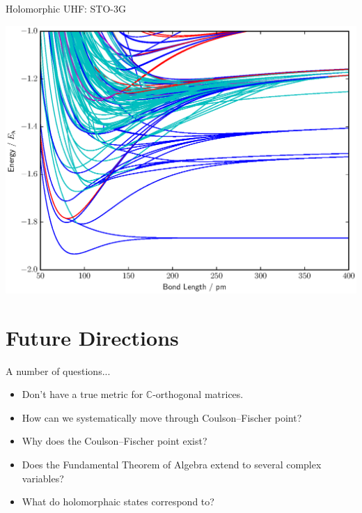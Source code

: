 \documentclass{beamer}
\begin{document}
\begin{frame}{Holomorphic UHF:  STO-3G}
\vspace{-0.9em}
  \begin{center}
    \includegraphics[scale=0.45]{BFGS_UHF_H4_rect_sto-3g}
  \end{center}
\end{frame}


\section{Future Directions}
\begin{frame}{A number of questions...}
 \begin{itemize}
  \item{Don't have a true metric for $\mathbb{C}$-orthogonal matrices.}
  \item{How can we systematically move through Coulson--Fischer point?}
  \item{Why does the Coulson--Fischer point exist?}
  \item{Does the Fundamental Theorem of Algebra extend to several complex variables?}
  \item{What do holomorphaic states correspond to?}
 \end{itemize}
\end{frame}
\end{document}
